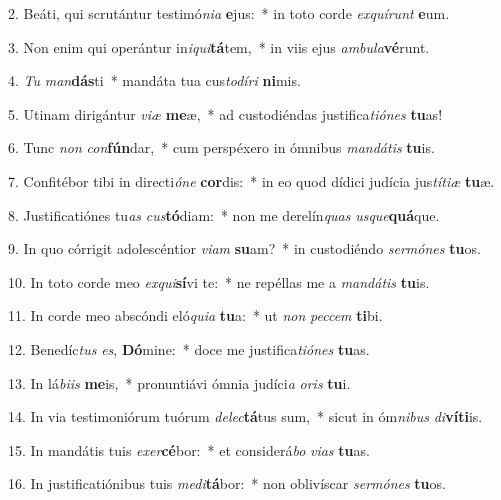 2. Beáti, qui scrutántur testimó\textit{ni}\textit{a} \textbf{e}jus:~*  in toto corde \textit{ex}\textit{quí}\textit{runt} \textbf{e}um.\

3. Non enim qui operántur in\textit{i}\textit{qui}\textbf{tá}tem,~*  in viis ejus \textit{am}\textit{bu}\textit{la}\textbf{vé}runt.\

4. \textit{Tu} \textit{man}\textbf{dás}ti~*  mandáta tua cus\textit{to}\textit{dí}\textit{ri} \textbf{ni}mis.\

5. Utinam dirigántur \textit{vi}\textit{æ} \textbf{me}æ,~*  ad custodiéndas justifica\textit{ti}\textit{ó}\textit{nes} \textbf{tu}as!\

6. Tunc \textit{non} \textit{con}\textbf{fún}dar,~*  cum perspéxero in ómnibus \textit{man}\textit{dá}\textit{tis} \textbf{tu}is.\

7. Confitébor tibi in directi\textit{ó}\textit{ne} \textbf{cor}dis:~*  in eo quod dídici judícia jus\textit{tí}\textit{ti}\textit{æ} \textbf{tu}æ.\

8. Justificatiónes tu\textit{as} \textit{cus}\textbf{tó}diam:~*  non me derelín\textit{quas} \textit{us}\textit{que}\textbf{quá}que.\

9. In quo córrigit adolescéntior \textit{vi}\textit{am} \textbf{su}am?~*  in custodiéndo \textit{ser}\textit{mó}\textit{nes} \textbf{tu}os.\

10. In toto corde meo \textit{ex}\textit{qui}\textbf{sí}vi te:~*  ne repéllas me a \textit{man}\textit{dá}\textit{tis} \textbf{tu}is.\

11. In corde meo abscóndi eló\textit{qui}\textit{a} \textbf{tu}a:~*  ut \textit{non} \textit{pec}\textit{cem} \textbf{ti}bi.\

12. Benedíc\textit{tus} \textit{es}, \textbf{Dó}mine:~*  doce me justifica\textit{ti}\textit{ó}\textit{nes} \textbf{tu}as.\

13. In lá\textit{bi}\textit{is} \textbf{me}is,~*  pronuntiávi ómnia judíci\textit{a} \textit{o}\textit{ris} \textbf{tu}i.\

14. In via testimoniórum tuórum \textit{de}\textit{lec}\textbf{tá}tus sum,~*  sicut in óm\textit{ni}\textit{bus} \textit{di}\textbf{ví}\textbf{ti}is.\

15. In mandátis tuis \textit{ex}\textit{er}\textbf{cé}bor:~*  et considerá\textit{bo} \textit{vi}\textit{as} \textbf{tu}as.\

16. In justificatiónibus tuis \textit{me}\textit{di}\textbf{tá}bor:~*  non oblivíscar \textit{ser}\textit{mó}\textit{nes} \textbf{tu}os.\

